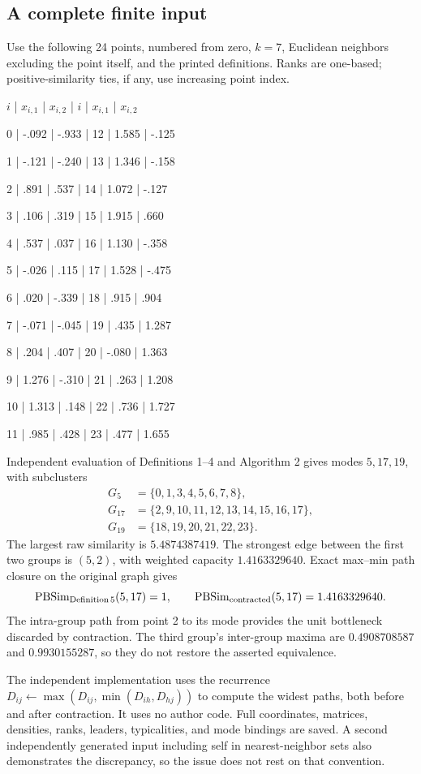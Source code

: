 \documentclass[10pt]{article}
\begin{document}
\subsection*{A complete finite input}
Use the following 24 points, numbered from zero, \(k=7\), Euclidean neighbors excluding the point itself, and the printed definitions. Ranks are one-based; positive-similarity ties, if any, use increasing point index.\par
\(i\) | \(x_{i,1}\) | \(x_{i,2}\) | \(i\) | \(x_{i,1}\) | \(x_{i,2}\)\par
0 | -.092 | -.933 | 12 | 1.585 | -.125\par
1 | -.121 | -.240 | 13 | 1.346 | -.158\par
2 | .891 | .537 | 14 | 1.072 | -.127\par
3 | .106 | .319 | 15 | 1.915 | .660\par
4 | .537 | .037 | 16 | 1.130 | -.358\par
5 | -.026 | .115 | 17 | 1.528 | -.475\par
6 | .020 | -.339 | 18 | .915 | .904\par
7 | -.071 | -.045 | 19 | .435 | 1.287\par
8 | .204 | .407 | 20 | -.080 | 1.363\par
9 | 1.276 | -.310 | 21 | .263 | 1.208\par
10 | 1.313 | .148 | 22 | .736 | 1.727\par
11 | .985 | .428 | 23 | .477 | 1.655\par
Independent evaluation of Definitions 1–4 and Algorithm 2 gives modes \(5,17,19\), with subclusters \[\begin{split}
 G_5&=\{0,1,3,4,5,6,7,8\},\\
 G_{17}&=\{2,9,10,11,12,13,14,15,16,17\},\\
 G_{19}&=\{18,19,20,21,22,23\}.
\end{split}\] The largest raw similarity is \(5.4874387419\). The strongest edge between the first two groups is \((5,2)\), with weighted capacity \(1.4163329640\). Exact max–min path closure on the original graph gives \[{\rm PBSim}_{\rm Definition\,5}(5,17)=1,
 \qquad
 {\rm PBSim}_{\rm contracted}(5,17)=1.4163329640.\] The intra-group path from point 2 to its mode provides the unit bottleneck discarded by contraction. The third group’s inter-group maxima are \(0.4908708587\) and \(0.9930155287\), so they do not restore the asserted equivalence.\par
The independent implementation uses the recurrence \(D_{ij}\leftarrow\max(D_{ij},\min(D_{ih},D_{hj}))\) to compute the widest paths, both before and after contraction. It uses no author code. Full coordinates, matrices, densities, ranks, leaders, typicalities, and mode bindings are saved. A second independently generated input including self in nearest-neighbor sets also demonstrates the discrepancy, so the issue does not rest on that convention.\par
\end{document}
